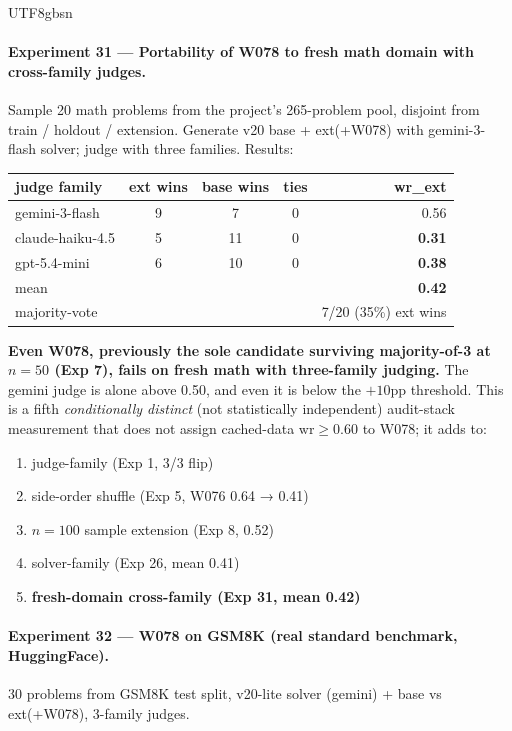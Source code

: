 \documentclass{article}
\begin{document}
\begin{CJK*}{UTF8}{gbsn}
\paragraph{Experiment 31 — Portability of W078 to fresh math domain
with cross-family judges.} Sample 20 math problems from the project's
265-problem pool, disjoint from train / holdout / extension. Generate
v20 base + ext(+W078) with gemini-3-flash solver; judge with three
families. Results:

\begin{center}\small
\begin{tabular}{l c c c r}
  \toprule
  judge family & ext wins & base wins & ties & wr\_ext \\
  \midrule
  gemini-3-flash       & 9 & 7  & 0 & 0.56 \\
  claude-haiku-4.5     & 5 & 11 & 0 & \textbf{0.31} \\
  gpt-5.4-mini         & 6 & 10 & 0 & \textbf{0.38} \\
  \midrule
  mean                 &   &    &   & \textbf{0.42} \\
  majority-vote        &   &    &   & 7/20 (35\%) ext wins \\
  \bottomrule
\end{tabular}
\end{center}

\textbf{Even W078, previously the sole candidate surviving
majority-of-3 at \(n=50\) (Exp 7), fails on fresh math with
three-family judging.} The gemini judge is alone above 0.50,
and even it is below the \(+10\)pp threshold. This is a fifth
\emph{conditionally distinct} (not statistically independent)
audit-stack measurement that does not assign cached-data
\(\mathrm{wr} \geq 0.60\) to W078; it adds to:

\begin{enumerate}[leftmargin=*, topsep=2pt, itemsep=0pt]
  \item judge-family (Exp 1, 3/3 flip)
  \item side-order shuffle (Exp 5, W076 0.64 → 0.41)
  \item \(n=100\) sample extension (Exp 8, 0.52)
  \item solver-family (Exp 26, mean 0.41)
  \item \textbf{fresh-domain cross-family (Exp 31, mean 0.42)}
\end{enumerate}

\paragraph{Experiment 32 — W078 on GSM8K (real standard benchmark,
HuggingFace).} 30 problems from GSM8K test split, v20-lite solver
(gemini) + base vs ext(+W078), 3-family judges.


\end{CJK*}
\end{document}
